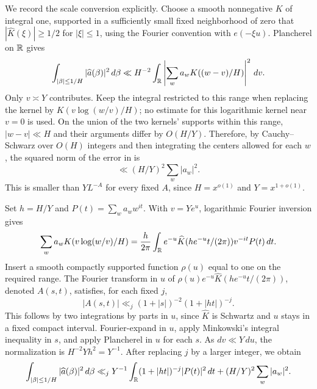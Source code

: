 We record the scale conversion explicitly. Choose a smooth
nonnegative $K$ of integral one, supported in a sufficiently small
fixed neighborhood of zero that $|\widehat K(\xi)|\geq1/2$ for
$|\xi|\leq1$, using the Fourier convention with $e(-\xi u)$.
Plancherel on $\mathbb R$ gives
\begin{equation}\label{eq:local-convolution}
 \int_{|\beta|\leq1/H}|\widehat a(\beta)|^2\,d\beta
 \ll H^{-2}\int_{\mathbb R}
        \left|\sum_w a_w K((w-v)/H)\right|^2\,dv.
\end{equation}
Only $v\asymp Y$ contributes. Keep the integral restricted to this
range when replacing the kernel by $K(v\log(w/v)/H)$; no estimate
for this logarithmic kernel near $v=0$ is used. On the union of
the two kernels' supports within this range,
$|w-v|\ll H$ and their arguments differ by $O(H/Y)$. Therefore,
by Cauchy--Schwarz over $O(H)$ integers and then integrating the
centers allowed for each $w$, the squared norm of the error in
 is
\begin{equation}\label{eq:kernel-error}
 \ll(H/Y)^2\sum_w|a_w|^2.
\end{equation}
This is smaller than $YL^{-A}$ for every fixed $A$, since
$H=x^{o(1)}$ and $Y=x^{1+o(1)}$.

Set $h=H/Y$ and $P(t)=\sum_w a_ww^{it}$. With $v=Ye^u$,
logarithmic Fourier inversion gives
\[
 \sum_w a_wK(v\log(w/v)/H)
  =\frac h{2\pi}\int_{\mathbb R}
         e^{-u}\widehat K(he^{-u}t/(2\pi))v^{-it}P(t)\,dt.
\]
Insert a smooth compactly supported function $\rho(u)$ equal to
one on the required range. The Fourier transform in $u$ of
$\rho(u)e^{-u}\widehat K(he^{-u}t/(2\pi))$, denoted $A(s,t)$,
satisfies, for each fixed $j$,
\[
 |A(s,t)|\ll_j(1+|s|)^{-2}(1+|ht|)^{-j}.
\]
This follows by two integrations by parts in $u$, since
$\widehat K$ is Schwartz and $u$ stays in a fixed compact interval.
Fourier-expand in $u$, apply Minkowski's integral inequality in $s$,
and apply Plancherel in $u$ for each $s$. As $dv\ll Y\,du$, the
normalization is $H^{-2}Yh^2=Y^{-1}$. After replacing $j$ by a
larger integer, we obtain
\begin{equation}\label{eq:local-mellin-energy}
 \int_{|\beta|\leq1/H}|\widehat a(\beta)|^2\,d\beta
 \ll_j Y^{-1}\int_{\mathbb R}(1+|ht|)^{-j}|P(t)|^2\,dt
          +(H/Y)^2\sum_w|a_w|^2.
\end{equation}

